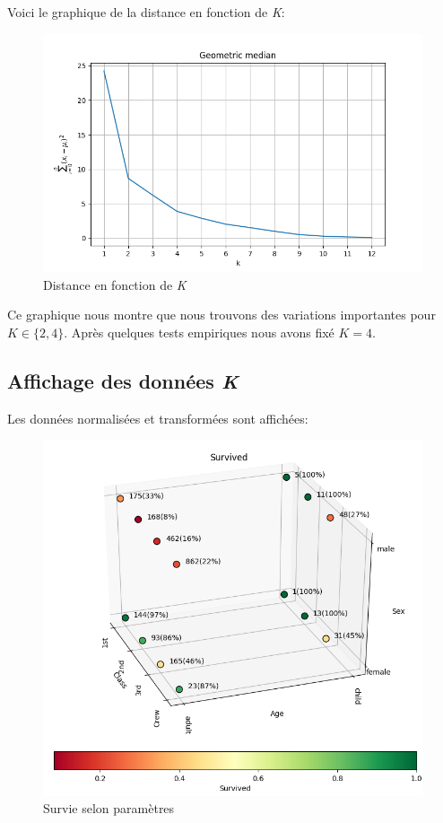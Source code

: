 \documentclass[11pt, a4paper]{article}
\begin{document}
Voici le graphique de la distance en fonction de \textit{K}:

\begin{figure}[H]
    \begin{center}
        \includegraphics[width=.8\textwidth]{ex1_geometric_median}
    \end{center}
    \caption{Distance en fonction de \textit{K}}
    \label{Distance en fonction de K}
\end{figure}

Ce graphique nous montre que nous trouvons des variations importantes pour $K\in\{2, 4\}$.
Après quelques tests empiriques nous avons fixé $K=4$.

\subsection{Affichage des données \textit{K}}

Les données normalisées et transformées sont affichées:

\begin{figure}[H]
    \begin{center}
        \includegraphics[width=.8\textwidth]{ex1_survived}
    \end{center}
    \caption{Survie selon paramètres}
    \label{Survie selon paramètres}
\end{figure}
\end{document}
